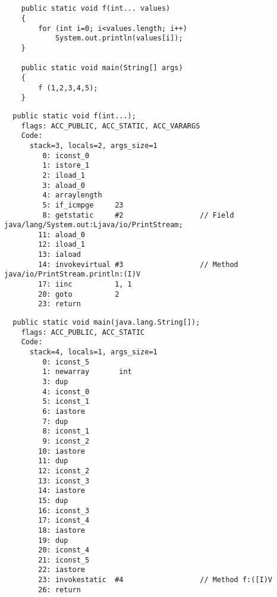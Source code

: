 \subsection{}


\begin{lstlisting}
	public static void f(int... values)
	{
		for (int i=0; i<values.length; i++)
			System.out.println(values[i]);
	}

	public static void main(String[] args) 
	{
		f (1,2,3,4,5);
	}
\end{lstlisting}

\begin{lstlisting}
  public static void f(int...);
    flags: ACC_PUBLIC, ACC_STATIC, ACC_VARARGS
    Code:
      stack=3, locals=2, args_size=1
         0: iconst_0      
         1: istore_1      
         2: iload_1       
         3: aload_0       
         4: arraylength   
         5: if_icmpge     23
         8: getstatic     #2                  // Field java/lang/System.out:Ljava/io/PrintStream;
        11: aload_0       
        12: iload_1       
        13: iaload        
        14: invokevirtual #3                  // Method java/io/PrintStream.println:(I)V
        17: iinc          1, 1
        20: goto          2
        23: return        
\end{lstlisting}


\begin{lstlisting}
  public static void main(java.lang.String[]);
    flags: ACC_PUBLIC, ACC_STATIC
    Code:
      stack=4, locals=1, args_size=1
         0: iconst_5      
         1: newarray       int
         3: dup           
         4: iconst_0      
         5: iconst_1      
         6: iastore       
         7: dup           
         8: iconst_1      
         9: iconst_2      
        10: iastore       
        11: dup           
        12: iconst_2      
        13: iconst_3      
        14: iastore       
        15: dup           
        16: iconst_3      
        17: iconst_4      
        18: iastore       
        19: dup           
        20: iconst_4      
        21: iconst_5      
        22: iastore       
        23: invokestatic  #4                  // Method f:([I)V
        26: return        
\end{lstlisting}

